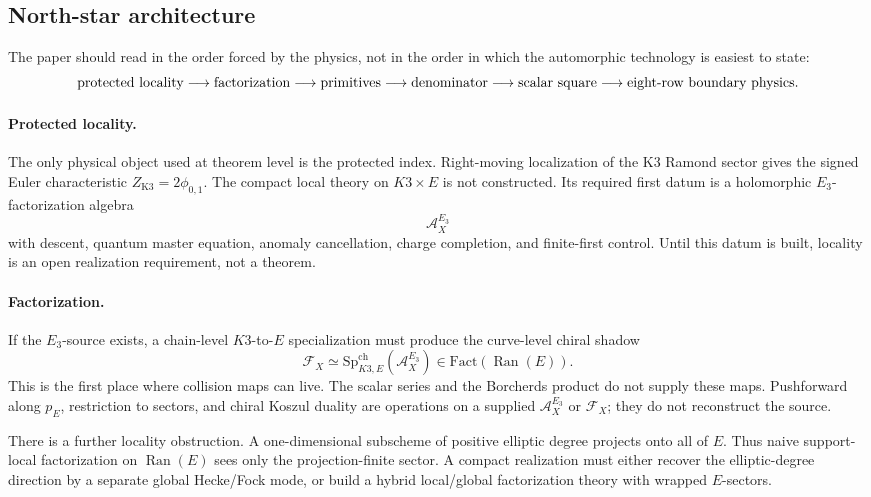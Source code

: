 \subsection{North-star architecture}

The paper should read in the order forced by the physics, not in the
order in which the automorphic technology is easiest to state:
\[
\hbox{protected locality}
\longrightarrow
\hbox{factorization}
\longrightarrow
\hbox{primitives}
\longrightarrow
\hbox{denominator}
\longrightarrow
\hbox{scalar square}
\longrightarrow
\hbox{eight-row boundary physics}.
\]

\paragraph{Protected locality.}
The only physical object used at theorem level is the protected index.
Right-moving localization of the K3 Ramond sector gives the signed
Euler characteristic \(Z_{\mathrm{K3}}=2\phi_{0,1}\).  The compact
local theory on \(K3\times E\) is not constructed.  Its required first
datum is a holomorphic \(E_3\)-factorization algebra
\[
\mathcal A^{E_3}_X
\]
with descent, quantum master equation, anomaly cancellation, charge
completion, and finite-first control.  Until this datum is built,
locality is an open realization requirement, not a theorem.

\paragraph{Factorization.}
If the \(E_3\)-source exists, a chain-level \(K3\)-to-\(E\)
specialization must produce the curve-level chiral shadow
\[
\mathcal F_X\simeq
\mathrm{Sp}^{\mathrm{ch}}_{K3,E}(\mathcal A^{E_3}_X)
\in \mathrm{Fact}(\operatorname{Ran}(E)).
\]
This is the first place where collision maps can live.  The scalar
series and the Borcherds product do not supply these maps.  Pushforward
along \(p_E\), restriction to sectors, and chiral Koszul duality are
operations on a supplied \(\mathcal A^{E_3}_X\) or \(\mathcal F_X\);
they do not reconstruct the source.

There is a further locality obstruction.  A one-dimensional subscheme of
positive elliptic degree projects onto all of \(E\).  Thus naive
support-local factorization on \(\operatorname{Ran}(E)\) sees only the
projection-finite sector.  A compact realization must either recover the
elliptic-degree direction by a separate global Hecke/Fock mode, or build
a hybrid local/global factorization theory with wrapped \(E\)-sectors.

